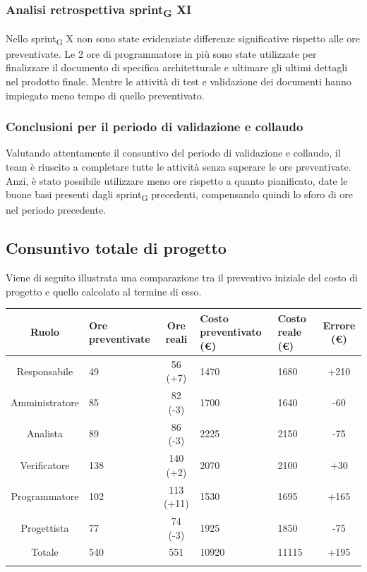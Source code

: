 \subsubsection{Analisi retrospettiva sprint\textsubscript{G} XI}

Nello sprint\textsubscript{G} X non sono state evidenziate differenze significative rispetto alle ore preventivate.
Le 2 ore di programmatore in più sono state utilizzate per finalizzare il documento di specifica architetturale e ultimare gli ultimi dettagli nel prodotto finale.
Mentre le attività di test e validazione dei documenti hanno impiegato meno tempo di quello preventivato.

\subsubsection{Conclusioni per il periodo di validazione e collaudo}

Valutando attentamente il consuntivo del periodo di validazione e collaudo, il team è riuscito a completare tutte le attività senza superare le ore preventivate. 
Anzi, è stato possibile utilizzare meno ore rispetto a quanto pianificato, date le buone basi presenti dagli sprint\textsubscript{G} precedenti, compensando quindi lo sforo di ore nel periodo precedente.




\newpage

\subsection{Consuntivo totale di progetto}
Viene di seguito illustrata una comparazione tra il preventivo iniziale del costo di progetto e quello calcolato al termine di esso.
\setlength\extrarowheight{5pt}
\begin{tabularx}{\textwidth}{|c|XcXX|c|}
	\hline
	\rowcolor{white}
	\textbf{Ruolo} & \textbf{Ore preventivate} & \textbf{Ore reali} & \textbf{Costo preventivato (€)} & \textbf{Costo reale (€)} & \textbf{Errore (€)} \\
	\hline
	Responsabile &49& 56 (+7) &1470&1680& +210 \\ 
	Amministratore &85& 82 (-3) &1700&1640& -60\\
	Analista &89&86 (-3)&2225&2150& -75 \\
	Verificatore &138&140 (+2)&2070&2100& +30 \\
	Programmatore &102&113 (+11)&1530&1695& +165 \\
	Progettista &77&74 (-3)&1925&1850& -75 \\
	\hline
	Totale &540&551&10920&11115&+195\\
	\hline
	\rowcolor{white}
	\caption{Consuntivo totale di ore e costi per ruolo}
\end{tabularx}



